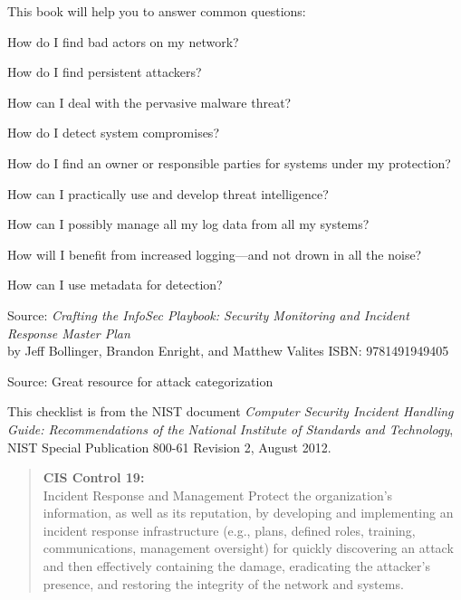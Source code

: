 \documentclass[Screen16to9,17pt]{foils}
\begin{document}
This book will help you to answer common questions:
\begin{list2}
\item How do I find bad actors on my network?
\item How do I find persistent attackers?
\item How can I deal with the pervasive malware threat?
\item How do I detect system compromises?
\item How do I find an owner or responsible parties for systems under my protection?
\item How can I practically use and develop threat intelligence?
\item How can I possibly manage all my log data from all my systems?
\item How will I benefit from increased logging—and not drown in all the noise?
\item How can I use metadata for detection?
\end{list2}
Source: \emph{Crafting the InfoSec Playbook: Security Monitoring and Incident Response Master Plan}\\
 by Jeff Bollinger, Brandon Enright, and Matthew Valites ISBN: 9781491949405




Source:  Great resource for attack categorization


This checklist is from the NIST document
\emph{Computer Security Incident Handling Guide: Recommendations of the National Institute
of Standards and Technology}, NIST Special Publication 800-61
Revision 2, August 2012.


\begin{quote}{\bf
CIS Control 19:}\\
Incident Response and Management Protect the organization’s information, as well as its reputation, by developing and implementing an incident response infrastructure (e.g., plans, defined roles, training, communications, management oversight) for quickly discovering an attack and then effectively containing the damage, eradicating the attacker’s presence, and restoring the integrity of the network and systems.
\end{quote}
\end{document}
